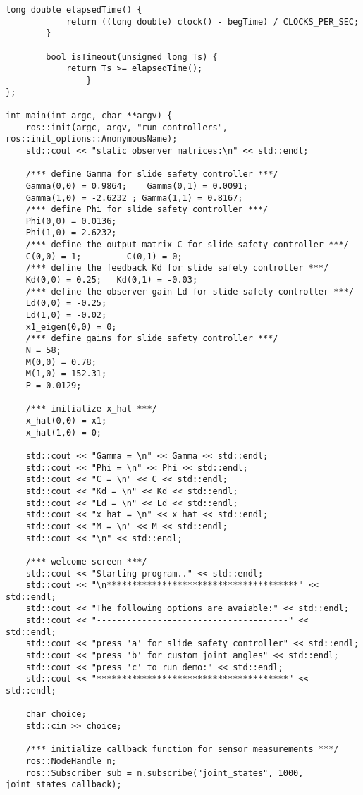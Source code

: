 \begin{lstlisting}[language=gedit]
		long double elapsedTime() {
			return ((long double) clock() - begTime) / CLOCKS_PER_SEC;
		}

		bool isTimeout(unsigned long Ts) {
			return Ts >= elapsedTime();
        		}
};

int main(int argc, char **argv) {
    ros::init(argc, argv, "run_controllers", ros::init_options::AnonymousName);
    std::cout << "static observer matrices:\n" << std::endl;

    /*** define Gamma for slide safety controller ***/
    Gamma(0,0) = 0.9864;    Gamma(0,1) = 0.0091;
    Gamma(1,0) = -2.6232 ; Gamma(1,1) = 0.8167;
    /*** define Phi for slide safety controller ***/
    Phi(0,0) = 0.0136;      
    Phi(1,0) = 2.6232;
    /*** define the output matrix C for slide safety controller ***/
    C(0,0) = 1;         C(0,1) = 0;
    /*** define the feedback Kd for slide safety controller ***/
    Kd(0,0) = 0.25;   Kd(0,1) = -0.03;
    /*** define the observer gain Ld for slide safety controller ***/
    Ld(0,0) = -0.25;
    Ld(1,0) = -0.02;
    x1_eigen(0,0) = 0;
    /*** define gains for slide safety controller ***/
    N = 58;
    M(0,0) = 0.78;
    M(1,0) = 152.31;
    P = 0.0129;

    /*** initialize x_hat ***/
    x_hat(0,0) = x1;
    x_hat(1,0) = 0;

    std::cout << "Gamma = \n" << Gamma << std::endl;
    std::cout << "Phi = \n" << Phi << std::endl;
    std::cout << "C = \n" << C << std::endl;
    std::cout << "Kd = \n" << Kd << std::endl;
    std::cout << "Ld = \n" << Ld << std::endl;
    std::cout << "x_hat = \n" << x_hat << std::endl;
    std::cout << "M = \n" << M << std::endl;
    std::cout << "\n" << std::endl;

    /*** welcome screen ***/
    std::cout << "Starting program.." << std::endl;
    std::cout << "\n**************************************" << std::endl;
    std::cout << "The following options are avaiable:" << std::endl;
    std::cout << "--------------------------------------" << std::endl;
    std::cout << "press 'a' for slide safety controller" << std::endl;
    std::cout << "press 'b' for custom joint angles" << std::endl;
    std::cout << "press 'c' to run demo:" << std::endl;
    std::cout << "**************************************" << std::endl;
    
    char choice;
    std::cin >> choice;

    /*** initialize callback function for sensor measurements ***/
    ros::NodeHandle n;
    ros::Subscriber sub = n.subscribe("joint_states", 1000, joint_states_callback);


\end{lstlisting}
